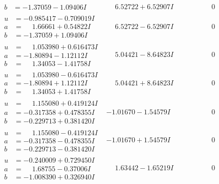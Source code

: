 \documentclass[1p]{elsarticle_modified}
\theoremstyle{definition}
\begin{document}
$$\begin{array}{c|c|c}
\begin{aligned}
b &= -1.37059 - 1.09406 I\end{aligned}
 & \phantom{-}6.52722 + 6.52907 I & \phantom{-0.000000 } 0 \\ \hline\begin{aligned}
u &= -0.985417 - 0.709019 I \\
a &= \phantom{-}1.66661 + 0.54822 I \\
b &= -1.37059 + 1.09406 I\end{aligned}
 & \phantom{-}6.52722 - 6.52907 I & \phantom{-0.000000 } 0 \\ \hline\begin{aligned}
u &= \phantom{-}1.053980 + 0.616473 I \\
a &= -1.80894 - 1.12112 I \\
b &= \phantom{-}1.34053 - 1.41758 I\end{aligned}
 & \phantom{-}5.04421 - 8.64823 I & \phantom{-0.000000 } 0 \\ \hline\begin{aligned}
u &= \phantom{-}1.053980 - 0.616473 I \\
a &= -1.80894 + 1.12112 I \\
b &= \phantom{-}1.34053 + 1.41758 I\end{aligned}
 & \phantom{-}5.04421 + 8.64823 I & \phantom{-0.000000 } 0 \\ \hline\begin{aligned}
u &= \phantom{-}1.155080 + 0.419124 I \\
a &= -0.317358 + 0.478355 I \\
b &= -0.229713 + 0.381420 I\end{aligned}
 & -1.01670 - 1.54579 I & \phantom{-0.000000 } 0 \\ \hline\begin{aligned}
u &= \phantom{-}1.155080 - 0.419124 I \\
a &= -0.317358 - 0.478355 I \\
b &= -0.229713 - 0.381420 I\end{aligned}
 & -1.01670 + 1.54579 I & \phantom{-0.000000 } 0 \\ \hline\begin{aligned}
u &= -0.240009 + 0.729450 I \\
a &= \phantom{-}1.68755 - 0.37006 I \\
b &= -1.008390 + 0.326940 I\end{aligned}
 & \phantom{-}1.63442 - 1.65219 I & \phantom{-0.000000 } 0 \\ \hline\begin{aligned}

\end{aligned}
\end{array}$$
\end{document}

